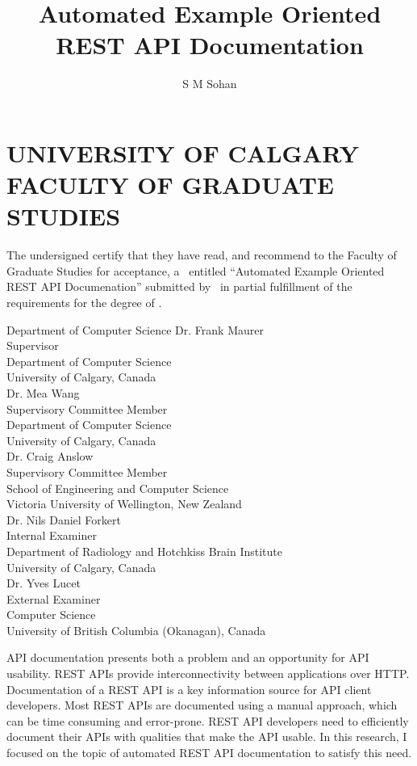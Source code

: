 \documentclass[12pt]{ucalgthes1}
\title{Automated Example Oriented REST API Documentation}
\author{S M Sohan}
\newcommand{\thesistitle}{Automated Example Oriented REST API Documenation}
\begin{document}
\makethesistitle
{}     %
\setcounter{page}{2}
\chapter*{UNIVERSITY OF CALGARY \\ FACULTY OF GRADUATE STUDIES}
\thispagestyle{empty}
The undersigned certify that they have read, and recommend
to the Faculty of Graduate Studies for acceptance, a \Thesis\ entitled
``\thesistitle'' submitted by \Author\
in partial fulfillment of the requirements for the degree of
\Degree.\\

%
%
\begin{signing}{Department of Computer Science}
\signline
Dr. Frank Maurer \\
Supervisor\\
Department of Computer Science \\
University of Calgary, Canada \\
\signline
Dr. Mea Wang\\
Supervisory Committee Member\\
Department of Computer Science \\
University of Calgary, Canada \\
\signline
Dr. Craig Anslow\\
Supervisory Committee Member\\
School of Engineering and Computer Science \\
Victoria University of Wellington, New Zealand\\
\signline
Dr. Nils Daniel Forkert\\
Internal Examiner\\
Department of Radiology and Hotchkiss Brain Institute\\
University of Calgary, Canada\\
\signline
Dr. Yves Lucet\\
External Examiner\\
Computer Science\\
University of British Columbia (Okanagan), Canada\\
\end{signing}
%
\newpage
{}
{}
API documentation presents both a problem and an opportunity for API usability. REST APIs provide interconnectivity between applications over HTTP. Documentation of a REST API is a key information source for API client developers. Most REST APIs are documented using a manual approach, which can be time consuming and error-prone. REST API developers need to efficiently document their APIs with qualities that make the API usable. In this research, I focused on the topic of automated REST API documentation to satisfy this need.
\end{document}
